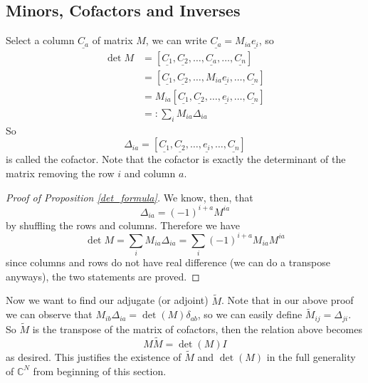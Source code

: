 \subsection{Minors, Cofactors and Inverses}
\begin{definition}
    Select a column $\underline{C_a}$ of matrix $M$, we can write $\underline{C_a}=M_{ia}\underline{e_i}$, so
    \begin{align*}
        \det M&=[\underline{C_1},\underline{C_2},\ldots,\underline{C_a},\ldots,\underline{C_n}]\\
        &=[\underline{C_1},\underline{C_2},\ldots,M_{ia}\underline{e_i},\ldots,\underline{C_n}]\\
        &=M_{ia}[\underline{C_1},\underline{C_2},\ldots,\underline{e_i},\ldots,\underline{C_n}]\\
        &=:\sum_iM_{ia}\Delta_{ia}
    \end{align*}
    So
    $$\Delta_{ia}=[\underline{C_1},\underline{C_2},\ldots,\underline{e_i},\ldots,\underline{C_n}]$$
    is called the cofactor.
    Note that the cofactor is exactly the determinant of the matrix removing the row $i$ and column $a$.
\end{definition}
\begin{proof}[Proof of Proposition \ref{det_formula}]
    We know, then, that
    $$\Delta_{ia}=(-1)^{i+a}M^{ia}$$
    by shuffling the rows and columns.
    Therefore we have
    $$\det M=\sum_iM_{ia}\Delta_{ia}=\sum_i(-1)^{i+a}M_{ia}M^{ia}$$
    since columns and rows do not have real difference (we can do a transpose anyways), the two statements are proved.
\end{proof}
Now we want to find our adjugate (or adjoint) $\tilde{M}$.
Note that in our above proof we can observe that $M_{ib}\Delta_{ia}=\det(M)\delta_{ab}$, so we can easily define $\tilde{M}_{ij}=\Delta_{ji}$.
So $\tilde{M}$ is the transpose of the matrix of cofactors, then the relation above becomes
$$M\tilde{M}=\det(M)I$$
as desired.
This justifies the existence of $\tilde{M}$ and $\det(M)$ in the full generality of $\mathbb C^N$ from beginning of this section.
